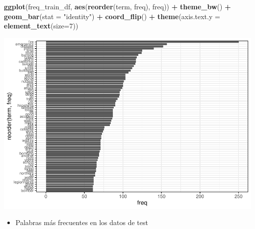 \documentclass[
]{article}
\newenvironment{Shaded}{\begin{snugshade}}{\end{snugshade}}
\newcommand{\DataTypeTok}[1]{\textcolor[rgb]{0.13,0.29,0.53}{#1}}
\newcommand{\DecValTok}[1]{\textcolor[rgb]{0.00,0.00,0.81}{#1}}
\newcommand{\KeywordTok}[1]{\textcolor[rgb]{0.13,0.29,0.53}{\textbf{#1}}}
\newcommand{\NormalTok}[1]{#1}
\newcommand{\OperatorTok}[1]{\textcolor[rgb]{0.81,0.36,0.00}{\textbf{#1}}}
\newcommand{\StringTok}[1]{\textcolor[rgb]{0.31,0.60,0.02}{#1}}
\providecommand{\tightlist}{%
  \setlength{\itemsep}{0pt}\setlength{\parskip}{0pt}}
\begin{document}
\begin{Shaded}
\begin{Highlighting}[]
\KeywordTok{ggplot}\NormalTok{(freq_train_df, }\KeywordTok{aes}\NormalTok{(}\KeywordTok{reorder}\NormalTok{(term, freq), freq)) }\OperatorTok{+}\StringTok{ }\KeywordTok{theme_bw}\NormalTok{() }\OperatorTok{+}\StringTok{ }
\StringTok{  }\KeywordTok{geom_bar}\NormalTok{(}\DataTypeTok{stat =} \StringTok{"identity"}\NormalTok{)  }\OperatorTok{+}\StringTok{ }
\StringTok{  }\KeywordTok{coord_flip}\NormalTok{() }\OperatorTok{+}\StringTok{ }
\StringTok{  }\KeywordTok{theme}\NormalTok{(}\DataTypeTok{axis.text.y =} \KeywordTok{element_text}\NormalTok{(}\DataTypeTok{size=}\DecValTok{7}\NormalTok{))}
\end{Highlighting}
\end{Shaded}

\begin{center}\includegraphics[width=0.7\linewidth]{document_files/figure-latex/unnamed-chunk-28-1} \end{center}

\begin{itemize}
\tightlist
\item
  Palabras más frecuentes en los datos de test
\end{itemize}

\begin{Shaded}
\end{Shaded}
\end{document}
